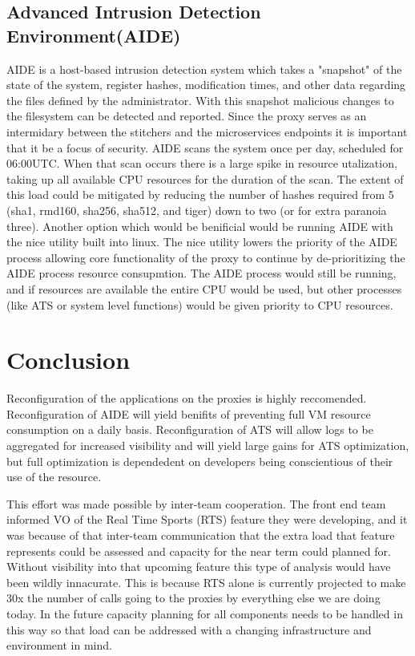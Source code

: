 \documentclass{article}
\begin{document}
\subsection{Advanced Intrusion Detection Environment(AIDE)}
\label{SECTION-AIDE}

AIDE is a host-based intrusion detection system which takes a "snapshot" of the state of the system, register hashes, modification times, and other data regarding the files defined by the administrator. With this snapshot malicious changes to the filesystem can be detected and reported. Since the proxy serves as an intermidary between the stitchers and the microservices endpoints it is important that it be a focus of security. AIDE scans the system once per day, scheduled for 06:00UTC. When that scan occurs there is a large spike in resource utalization, taking up all available CPU resources for the duration of the scan. The extent of this load could be mitigated by reducing the number of hashes required from 5 (sha1, rmd160, sha256, sha512, and tiger) down to two (or for extra paranoia three). Another option which would be benificial would be running AIDE with the nice utility built into linux. The nice utility lowers the priority of the AIDE process allowing core functionality of the proxy to continue by de-prioritizing the AIDE process resource consupmtion. The AIDE process would still be running, and if resources are available the entire CPU would be used, but other processes (like ATS or system level functions) would be given priority to CPU resources. 



\section{Conclusion}
\label{SECTION-Conclusion}
Reconfiguration of the applications on the proxies is highly reccomended. Reconfiguration of AIDE will yield benifits of preventing full VM resource consumption on a daily basis. Reconfiguration of ATS will allow logs to be aggregated for increased visibility and will yield large gains for ATS optimization, but full optimization is dependedent on developers being conscientious of their use of the resource. 

This effort was made possible by inter-team cooperation. The front end team informed VO of the Real Time Sports (RTS) feature they were developing, and it was because of that inter-team communication that the extra load that feature represents could be assessed and capacity for the near term could planned for. Without visibility into that upcoming feature this type of analysis would have been wildly innacurate. This is because RTS alone is currently projected to make 30x the number of calls going to the proxies by everything else we are doing today. In the future capacity planning for all components needs to be handled in this way so that load can be addressed with a changing infrastructure and environment in mind. 
\end{document}
